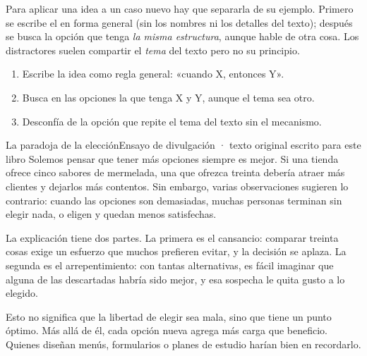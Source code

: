 

Para aplicar una idea a un caso nuevo hay que separarla de su ejemplo. Primero se escribe el  en forma
general (sin los nombres ni los detalles del texto); después se busca la opción que tenga \emph{la misma estructura},
aunque hable de otra cosa. Los distractores suelen compartir el \emph{tema} del texto pero no su principio.


\begin{regla}
\begin{enumerate}
  \item Escribe la idea como regla general: «cuando X, entonces Y».
  \item Busca en las opciones la que tenga X y Y, aunque el tema sea otro.
  \item Desconfía de la opción que repite el tema del texto sin el mecanismo.
\end{enumerate}
\end{regla}

\begin{texto}{La paradoja de la elección}{Ensayo de divulgación · texto original escrito para este libro}
\pa Solemos pensar que tener más opciones siempre es mejor. Si una tienda ofrece cinco sabores de mermelada, una que
ofrezca treinta debería atraer más clientes y dejarlos más contentos. Sin embargo, varias observaciones sugieren lo
contrario: cuando las opciones son demasiadas, muchas personas terminan sin elegir nada, o eligen y quedan menos
satisfechas.

\pa La explicación tiene dos partes. La primera es el cansancio: comparar treinta cosas exige un esfuerzo que muchos
prefieren evitar, y la decisión se aplaza. La segunda es el arrepentimiento: con tantas alternativas, es fácil imaginar
que alguna de las descartadas habría sido mejor, y esa sospecha le quita gusto a lo elegido.

\pa Esto no significa que la libertad de elegir sea mala, sino que tiene un punto óptimo. Más allá de él, cada opción nueva
agrega más carga que beneficio. Quienes diseñan menús, formularios o planes de estudio harían bien en recordarlo.
\end{texto}

